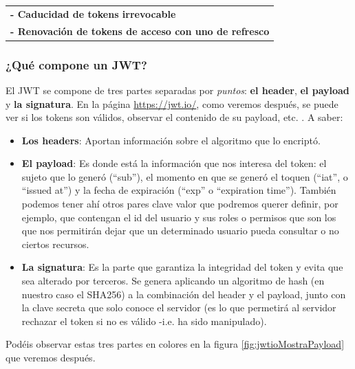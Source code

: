 \documentclass[a4paper,12pt]{report}
\begin{document}
				  \begin{tabular}{l}
					 \textbf{- Caducidad de tokens irrevocable}\\
					 \textbf{- Renovación de tokens de acceso con uno de refresco}
				  \end{tabular}
				 

				
				
				
				\subsubsection{¿Qué compone un JWT?}
				\label{sec:queComponeJWTbackend}
				
				\noindent El JWT se compone de tres partes separadas por \textit{puntos}: \textbf{el header}, \textbf{el payload} y \textbf{la signatura}. En la página \href{https://jwt.io/}{https://jwt.io/}, como veremos después, se puede ver si los tokens son válidos, observar el contenido de su payload, etc. \cite{jwtio}. A saber:
				

				\begin{itemize}
					\setlength{\itemsep}{-.5em}
					\item 				\textbf{Los headers}: Aportan información sobre el algoritmo que lo encriptó.
					\item 				\textbf{El payload}: Es donde está la información que nos interesa del token: el sujeto que lo generó (``sub''), el momento en que se generó el toquen (``iat'', o ``issued at'') y la fecha de expiración (``exp'' o ``expiration time''). También podemos tener ahí otros pares clave valor que podremos querer definir, por ejemplo, que contengan el id del usuario y sus roles o permisos que son los que nos permitirán dejar que un determinado usuario pueda consultar o no ciertos recursos.
					
					\item \textbf{La signatura}: Es la parte que garantiza la integridad del token y evita que sea alterado por terceros. Se genera aplicando un algoritmo de hash (en nuestro caso el SHA256) a la combinación del header y el payload, junto con la clave secreta que solo conoce el servidor (es lo que permetirá al servidor rechazar el token si no es válido -i.e. ha sido manipulado).
				\end{itemize}
				
				Podéis observar estas tres partes en colores en la figura \ref{fig:jwtioMostraPayload} que veremos después.
				
				
				
\end{document}
